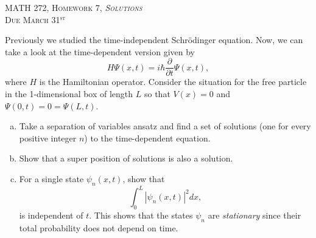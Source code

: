 \documentclass[12pt]{article} %
\begin{document}
\begin{center}
   \textsc{\large MATH 272, Homework 7, \emph{Solutions}}\\
   \textsc{Due March 31$^\textrm{st}$}
\end{center}
\vspace{.5cm}

\begin{problem}
Previously we studied the time-independent Schr\"odinger equation. Now, we can take a look at the time-dependent version given by
\[
H \Psi(x,t) = i\hbar \frac{\partial}{\partial t} \Psi(x,t),
\]
where $H$ is the Hamiltonian operator.  Consider the situation for the free particle in the 1-dimensional box of length $L$ so that $V(x)=0$ and $\Psi(0,t)=0=\Psi(L,t)$.  
\begin{enumerate}[(a)]
    \item Take a separation of variables ansatz and find a set of solutions (one for every positive integer $n$) to the time-dependent equation.
    \item Show that a super position of solutions is also a solution.
    \item For a single state $\psi_n(x,t)$, show that 
    \[
    \int_0^L \left|\psi_n(x,t)\right|^2 dx,
    \]
    is independent of $t$. This shows that the states $\psi_n$ are \emph{stationary} since their total probability does not depend on time.
\end{enumerate}
\end{problem}
\end{document}
